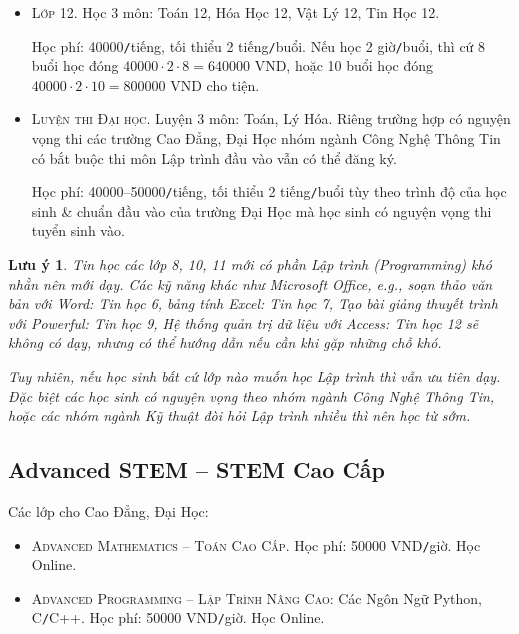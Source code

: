 \documentclass{article}
\numberwithin{equation}{section}
\newtheorem{luuy}{Lưu ý}
\begin{document}
\begin{itemize}
	{\sf Học phí:} 40000{\tt/}tiếng $\ge2$ tiếng{\tt/}buổi. Nếu học 2 giờ{\tt/}buổi, thì cứ 8 buổi học đóng $40000\cdot2\cdot8 = 640000$ VND, hoặc 10 buổi học đóng $40000\cdot2\cdot10 = 800000$ VND cho tiện.
	\item \textsc{Lớp 12.} Học 3 môn: Toán 12, Hóa Học 12, Vật Lý 12, Tin Học 12.
	
	{\sf Học phí:} 40000{\tt/}tiếng, tối thiểu 2 tiếng{\tt/}buổi. Nếu học 2 giờ{\tt/}buổi, thì cứ 8 buổi học đóng $40000\cdot2\cdot8 = 640000$ VND, hoặc 10 buổi học đóng $40000\cdot2\cdot10 = 800000$ VND cho tiện.
	\item \textsc{Luyện thi Đại học.} Luyện 3 môn: Toán, Lý Hóa. Riêng trường hợp có nguyện vọng thi các trường Cao Đẳng, Đại Học nhóm ngành Công Nghệ Thông Tin có bắt buộc thi môn Lập trình đầu vào vẫn có thể đăng ký.
	
	{\sf Học phí:} 40000--50000{\tt/}tiếng, tối thiểu 2 tiếng{\tt/}buổi tùy theo trình độ của học sinh \& chuẩn đầu vào của trường Đại Học mà học sinh có nguyện vọng thi tuyển sinh vào.
\end{itemize}

\begin{luuy}
	Tin học các lớp 8, 10, 11 mới có phần Lập trình (Programming) khó nhằn nên mới dạy. Các kỹ năng khác như Microsoft Office, e.g., soạn thảo văn bản với Word: Tin học 6, bảng tính Excel: Tin học 7, Tạo bài giảng thuyết trình với Powerful: Tin học 9, Hệ thống quản trị dữ liệu với Access: Tin học 12 sẽ không có dạy, nhưng có thể hướng dẫn nếu cần khi gặp những chỗ khó.
	
	Tuy nhiên, nếu học sinh bất cứ lớp nào muốn học Lập trình thì vẫn ưu tiên dạy. Đặc biệt các học sinh có nguyện vọng theo nhóm ngành Công Nghệ Thông Tin, hoặc các nhóm ngành Kỹ thuật đòi hỏi Lập trình nhiều thì nên học từ sớm.
\end{luuy}

\subsection{Advanced STEM -- STEM Cao Cấp}
Các lớp cho Cao Đẳng, Đại Học:
\begin{itemize}
	\item \textsc{Advanced Mathematics -- Toán Cao Cấp}. {\sf Học phí:} 50000 VND{\tt/}giờ. Học Online.
	\item \textsc{Advanced Programming -- Lập Trình Nâng Cao}: Các Ngôn Ngữ Python, C{\tt/}C++. {\sf Học phí:} 50000 VND{\tt/}giờ. Học Online.
\end{itemize}
\end{document}
